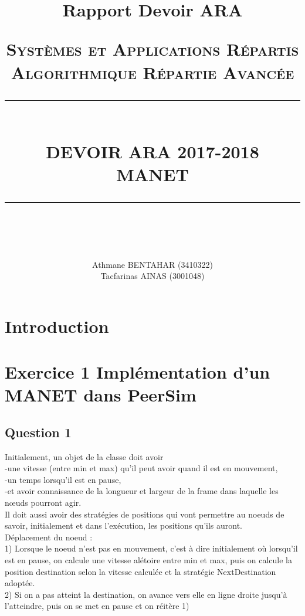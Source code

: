 \documentclass[10pt]{report}
\title{Rapport Devoir ARA}															%
\newcommand{\HRule}[1]{\rule{\linewidth}{#1}}										%
\begin{document}
\title{ \normalsize \textsc{\LARGE {Systèmes et Applications Répartis}\\\Large{Algorithmique Répartie Avancée}}
		\\ [2.0cm]
		\HRule{0.5pt} \\
		\LARGE \textbf{\uppercase{Devoir ARA 2017-2018\\MANET}}
		\HRule{2pt} \\ [0.5cm]
		\normalsize \vspace*{3\baselineskip}}

\author{
		Athmane BENTAHAR (3410322)\\Tacfarinas AINAS (3001048)}

\maketitle
\tableofcontents
\newpage
\sectionfont{\scshape}
\section{Introduction}
\section{Exercice 1  Implémentation d'un MANET dans PeerSim}
\subsection{Question 1}
Initialement, un objet de la classe doit avoir \\
-une vitesse (entre min et max) qu'il peut avoir quand il est en mouvement, \\
-un temps lorsqu'il est en pause, \\
-et avoir connaissance de la longueur et largeur de la frame dans laquelle les nœuds pourront agir. \\
Il doit aussi avoir des stratégies de positions qui vont permettre au noeuds de savoir, initialement et dans l'exécution, les positions qu'ils auront. \\
Déplacement du noeud : \\
1) Lorsque le noeud n'est pas en mouvement, c'est à dire initialement où lorsqu'il est en pause, on calcule une vitesse alétoire entre min et max, puis on calcule la position destination selon la vitesse calculée et la stratégie NextDestination adoptée. \\
2) Si on a pas atteint la destination, on avance vers elle en ligne droite jusqu'à l'atteindre, puis on se met en pause et on réitère 1) \\
\end{document}

